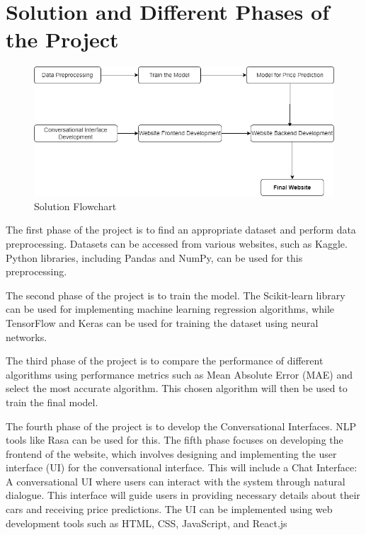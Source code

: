 \documentclass[a4paper,12pt]{article}
\begin{document}
\section*{Solution and Different Phases of the Project}
\begin{justify}
\begin{figure}[h]
    \centering
    \includegraphics[width=.8\textwidth]{./Flowchart2.png}
    \caption{Solution Flowchart}
    \label{fig:your-label}
\end{figure}
\vspace{\baselineskip} 
The first phase of the project is to find an appropriate dataset and perform data preprocessing. Datasets can be accessed from various websites, such as Kaggle. Python libraries, including Pandas and NumPy, can be used for this preprocessing. 
\newline

The second phase of the project is to train the model. The Scikit-learn library can be used for implementing machine learning regression algorithms, while TensorFlow and Keras can be used for training the dataset using neural networks.
\newline

The third phase of the project is to compare the performance of different algorithms using performance metrics such as Mean Absolute Error (MAE) and select the most accurate algorithm. This chosen algorithm will then be used to train the final model.
\newline

The fourth phase of the project is to develop the Conversational Interfaces. NLP tools like Rasa can be used for this.
\newline
\newline
The fifth phase focuses on developing the frontend of the website, which involves designing and implementing the user interface (UI) for the conversational interface. This will include a Chat Interface: A conversational UI where users can interact with the system through natural dialogue. This interface will guide users in providing necessary details about their cars and receiving price predictions. The UI can be implemented using web development tools such as HTML, CSS, JavaScript, and React.js
\newline


\end{justify}
\end{document}
